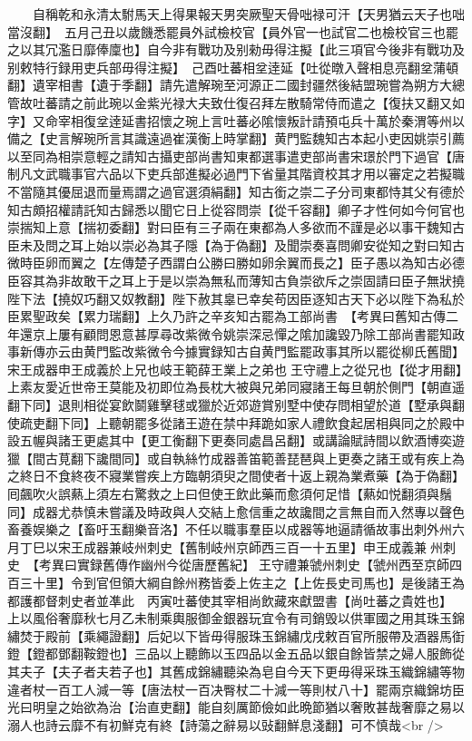 　　自稱乾和永清太駙馬天上得果報天男突厥聖天骨咄禄可汗【天男猶云天子也咄當沒翻】　五月己丑以歲饑悉罷員外試檢校官【員外官一也試官二也檢校官三也罷之以其冗濫日靡俸廩也】自今非有戰功及别勑毋得注擬【此三項官今後非有戰功及别敕特行録用吏兵部毋得注擬】　己酉吐蕃相坌逹延【吐從暾入聲相息亮翻坌蒲頓翻】遺宰相書【遺于季翻】請先遣解琬至河源正二國封疆然後結盟琬嘗為朔方大總管故吐蕃請之前此琬以金紫光禄大夫致仕復召拜左散騎常侍而遣之【復扶又翻又如字】又命宰相復坌逹延書招懷之琬上言吐蕃必隂懷叛計請預屯兵十萬於秦渭等州以備之【史言解琬所言其識遠過崔漢衡上時掌翻】黄門監魏知古本起小吏因姚崇引薦以至同為相崇意輕之請知古攝吏部尚書知東都選事遣吏部尚書宋璟於門下過官【唐制凡文武職事官六品以下吏兵部進擬必過門下省量其階資校其才用以審定之若擬職不當隨其優屈退而量焉謂之過官選須絹翻】知古銜之崇二子分司東都恃其父有德於知古頗招權請託知古歸悉以聞它日上從容問崇【從千容翻】卿子才性何如今何官也崇揣知上意【揣初委翻】對曰臣有三子兩在東都為人多欲而不謹是必以事干魏知古臣未及問之耳上始以崇必為其子隱【為于偽翻】及聞崇奏喜問卿安從知之對曰知古微時臣卵而翼之【左傳楚子西謂白公勝曰勝如卵余翼而長之】臣子愚以為知古必德臣容其為非故敢干之耳上于是以崇為無私而薄知古負崇欲斥之崇固請曰臣子無狀撓陛下法【撓奴巧翻又奴教翻】陛下赦其辠已幸矣苟因臣逐知古天下必以陛下為私於臣累聖政矣【累力瑞翻】上久乃許之辛亥知古罷為工部尚書　【考異曰舊知古傳二年還京上屢有顧問恩意甚厚尋改紫微令姚崇深忌憚之隂加讒毀乃除工部尚書罷知政事新傳亦云由黄門監改紫微令今據實録知古自黄門監罷政事其所以罷從柳氏舊聞】　宋王成器申王成義於上兄也岐王範薛王業上之弟也王守禮上之從兄也【從才用翻】上素友愛近世帝王莫能及初即位為長枕大被與兄弟同寢諸王每旦朝於側門【朝直遥翻下同】退則相從宴飲鬬雞擊毬或獵於近郊遊賞别墅中使存問相望於道【墅承與翻使疏吏翻下同】上聽朝罷多從諸王遊在禁中拜跪如家人禮飲食起居相與同之於殿中設五幄與諸王更處其中【更工衡翻下更奏同處昌呂翻】或講論賦詩間以飲酒博奕遊獵【間古莧翻下讒間同】或自執絲竹成器善笛範善琵琶與上更奏之諸王或有疾上為之終日不食終夜不寢業嘗疾上方臨朝須臾之間使者十返上親為業煮藥【為于偽翻】囘飆吹火誤爇上須左右驚救之上曰但使王飲此藥而愈須何足惜【爇如悦翻須與鬚同】成器尤恭慎未嘗議及時政與人交結上愈信重之故讒間之言無自而入然專以聲色畜養娱樂之【畜吁玉翻樂音洛】不任以職事羣臣以成器等地逼請循故事出刺外州六月丁巳以宋王成器兼岐州刺史【舊制岐州京師西三百一十五里】申王成義兼州刺史　【考異曰實録舊傳作幽州今從唐歷舊紀】王守禮兼虢州刺史【虢州西至京師四百三十里】令到官但領大綱自餘州務皆委上佐主之【上佐長史司馬也】是後諸王為都護都督刺史者並凖此　丙寅吐蕃使其宰相尚飲藏來獻盟書【尚吐蕃之貴姓也】　上以風俗奢靡秋七月乙未制乘輿服御金銀器玩宜令有司銷毁以供軍國之用其珠玉錦繡焚于殿前【乘繩證翻】后妃以下皆毋得服珠玉錦繡戊戌敕百官所服帶及酒器馬衘鐙【鐙都鄧翻鞍鐙也】三品以上聽飾以玉四品以金五品以銀自餘皆禁之婦人服飾從其夫子【夫子者夫若子也】其舊成錦繡聽染為皂自今天下更毋得采珠玉織錦繡等物違者杖一百工人減一等【唐法杖一百决臀杖二十減一等則杖八十】罷兩京織錦坊臣光曰明皇之始欲為治【治直吏翻】能自刻厲節儉如此晩節猶以奢敗甚哉奢靡之易以溺人也詩云靡不有初鮮克有終【詩蕩之辭易以䜴翻鮮息淺翻】可不慎哉<br />

